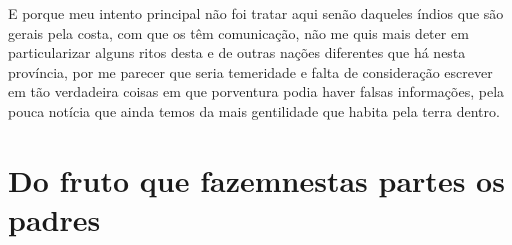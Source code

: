 E porque meu intento principal não foi tratar aqui senão daqueles índios
que são gerais pela costa, com que os  têm comunicação, não
me quis mais deter em particularizar alguns ritos desta e de outras
nações diferentes que há nesta província, por me parecer que seria
temeridade e falta de consideração escrever em  tão verdadeira
coisas em que porventura podia haver falsas informações, pela pouca \EP[1]
notícia que ainda temos da mais gentilidade que habita pela terra dentro.		%

\chapter[Do fruto que fazem nestas partes os padres]{Do fruto que
fazem\break nestas partes os padres} 

